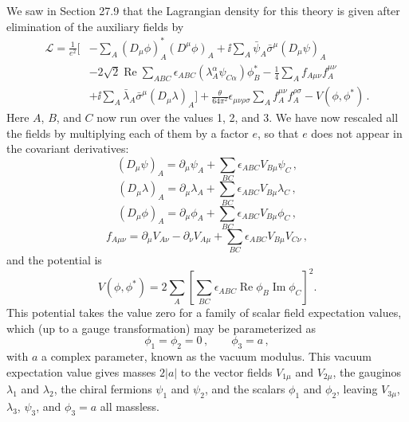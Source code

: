 We saw in Section 27.9 that the Lagrangian density for this theory is given
after elimination of the auxiliary fields by
\begin{equation}
  \begin{aligned}
  \mathcal{L}
  =\frac{1}{e^2}\Biggl[
  &-\sum_A(D_\mu\phi)_A^*(D^\mu\phi)_A
  +\ii\sum_A\bar\psi_A\bar\sigma^\mu(D_\mu\psi)_A
  \\
  &-2\sqrt{2}\operatorname{Re}\sum_{ABC}
    \epsilon_{ABC}
    \left(\lambda_A^\alpha\psi_{C\alpha}\right)\phi_B^*
  -\frac14\sum_A f_{A\mu\nu}f_A^{\mu\nu}
  \\
  &+\ii\sum_A\bar\lambda_A\bar\sigma^\mu(D_\mu\lambda)_A
  \Biggr]
  +\frac{\theta}{64\pi^2}\epsilon_{\mu\nu\rho\sigma}
    \sum_A f_A^{\mu\nu}f_A^{\rho\sigma}
  -V(\phi,\phi^*)\,.
  \end{aligned}
  \tag{29.5.1}\label{eq:29.5.1}
\end{equation}
Here \(A\), \(B\), and \(C\) now run over the values 1, 2, and 3. We have now
rescaled all the fields by multiplying each of them by a factor \(e\), so
that \(e\) does not appear in the covariant derivatives:
\begin{equation}
  (D_\mu\psi)_A
  =\partial_\mu\psi_A+\sum_{BC}\epsilon_{ABC}V_{B\mu}\psi_C\,,
  \tag{29.5.2}\label{eq:29.5.2}
\end{equation}
\begin{equation}
  (D_\mu\lambda)_A
  =\partial_\mu\lambda_A+\sum_{BC}\epsilon_{ABC}V_{B\mu}\lambda_C\,,
  \tag{29.5.3}\label{eq:29.5.3}
\end{equation}
\begin{equation}
  (D_\mu\phi)_A
  =\partial_\mu\phi_A+\sum_{BC}\epsilon_{ABC}V_{B\mu}\phi_C\,,
  \tag{29.5.4}\label{eq:29.5.4}
\end{equation}
\begin{equation}
  f_{A\mu\nu}
  =\partial_\mu V_{A\nu}-\partial_\nu V_{A\mu}
  +\sum_{BC}\epsilon_{ABC}V_{B\mu}V_{C\nu}\,,
  \tag{29.5.5}\label{eq:29.5.5}
\end{equation}
and the potential is
\begin{equation}
  V(\phi,\phi^*)
  =2\sum_A\left[
    \sum_{BC}\epsilon_{ABC}\operatorname{Re}\phi_B
    \operatorname{Im}\phi_C
  \right]^2.
  \tag{29.5.6}\label{eq:29.5.6}
\end{equation}
This potential takes the value zero for a family of scalar field expectation
values, which (up to a gauge transformation) may be parameterized as
\begin{equation}
  \phi_1=\phi_2=0\,,
  \qquad
  \phi_3=a\,,
  \tag{29.5.7}\label{eq:29.5.7}
\end{equation}
with \(a\) a complex parameter, known as the vacuum modulus. This vacuum
expectation value gives masses \(2\lvert a\rvert\) to the vector fields
\(V_{1\mu}\) and \(V_{2\mu}\), the gauginos \(\lambda_1\) and \(\lambda_2\),
the chiral fermions \(\psi_1\) and \(\psi_2\), and the scalars \(\phi_1\) and
\(\phi_2\), leaving \(V_{3\mu}\), \(\lambda_3\), \(\psi_3\), and
\(\phi_3=a\) all massless.

